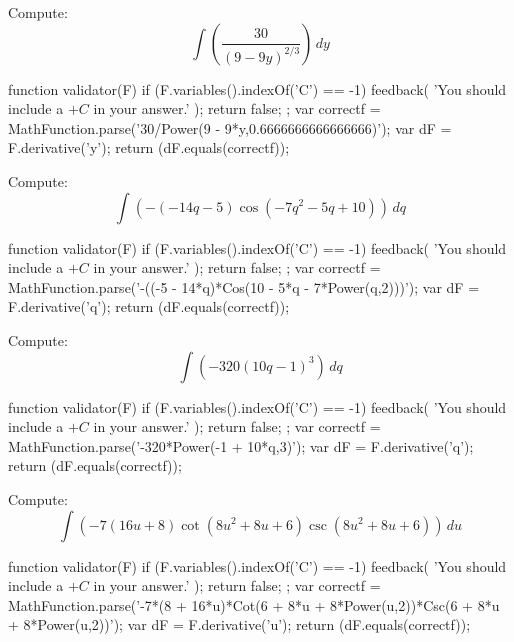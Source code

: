 \documentclass{ximera}
\renewcommand{\d}{\, d}
\begin{document}
\begin{exercise}
Compute: 
\[
\int \left(\frac{30}{(9-9 y)^{2/3}}\right)\d y
\]
\begin{expressionAnswer}
     function validator(F) {
      if (F.variables().indexOf('C') == -1) {
        feedback( 'You should include a $+C$ in your answer.' );
        return false;
      };      
      var correctf = MathFunction.parse('30/Power(9 - 9*y,0.6666666666666666)');
      var dF = F.derivative('y');
      return (dF.equals(correctf));
    }
\end{expressionAnswer}
\end{exercise}



\begin{exercise}
Compute: 
\[
\int \left(-(-14 q-5) \cos \left(-7 q^2-5 q+10\right)\right)\d q
\]
\begin{expressionAnswer}
     function validator(F) {
      if (F.variables().indexOf('C') == -1) {
        feedback( 'You should include a $+C$ in your answer.' );
        return false;
      };      
      var correctf = MathFunction.parse('-((-5 - 14*q)*Cos(10 - 5*q - 7*Power(q,2)))');
      var dF = F.derivative('q');
      return (dF.equals(correctf));
    }
\end{expressionAnswer}
\end{exercise}



\begin{exercise}
Compute: 
\[
\int \left(-320 (10 q-1)^3\right)\d q
\]
\begin{expressionAnswer}
     function validator(F) {
      if (F.variables().indexOf('C') == -1) {
        feedback( 'You should include a $+C$ in your answer.' );
        return false;
      };      
      var correctf = MathFunction.parse('-320*Power(-1 + 10*q,3)');
      var dF = F.derivative('q');
      return (dF.equals(correctf));
    }
\end{expressionAnswer}
\end{exercise}



\begin{exercise}
Compute: 
\[
\int \left(-7 (16 u+8) \cot \left(8 u^2+8 u+6\right) \csc \left(8 u^2+8 u+6\right)\right)\d u
\]
\begin{expressionAnswer}
     function validator(F) {
      if (F.variables().indexOf('C') == -1) {
        feedback( 'You should include a $+C$ in your answer.' );
        return false;
      };      
      var correctf = MathFunction.parse('-7*(8 + 16*u)*Cot(6 + 8*u + 8*Power(u,2))*Csc(6 + 8*u + 8*Power(u,2))');
      var dF = F.derivative('u');
      return (dF.equals(correctf));
    }
\end{expressionAnswer}
\end{exercise}
\end{document}
